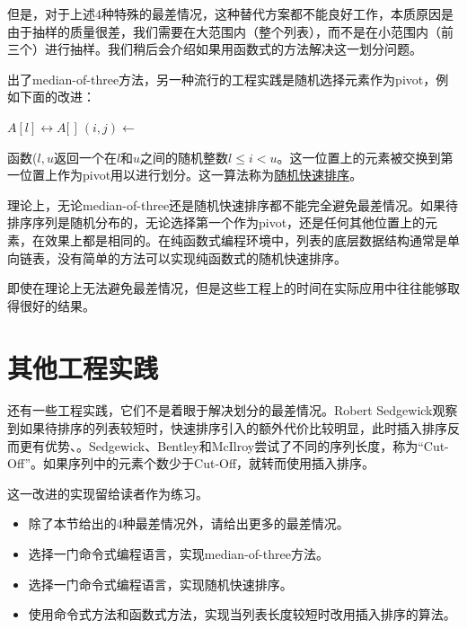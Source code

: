 \documentclass[UTF8]{article}
\begin{document}
但是，对于上述4种特殊的最差情况，这种替代方案都不能良好工作，本质原因是由于抽样的质量很差，我们需要在大范围内（整个列表），而不是在小范围内（前三个）进行抽样。我们稍后会介绍如果用函数式的方法解决这一划分问题。

出了median-of-three方法，另一种流行的工程实践是随机选择元素作为pivot，例如下面的改进：

\begin{algorithmic}[1]
    \State {} $A[l] \leftrightarrow A[$  $]$
    \State $(i, j) \gets $ 
    \State {}
    \State {}
  \EndIf
\EndProcedure
\end{algorithmic}

函数($l, u$返回一个在$l$和$u$之间的随机整数$l \leq i < u$。这一位置上的元素被交换到第一位置上作为pivot用以进行划分。这一算法称为\underline{随机快速排序}\cite{CLRS}。

理论上，无论median-of-three还是随机快速排序都不能完全避免最差情况。如果待排序序列是随机分布的，无论选择第一个作为pivot，还是任何其他位置上的元素，在效果上都是相同的。在纯函数式编程环境中，列表的底层数据结构通常是单向链表，没有简单的方法可以实现纯函数式的随机快速排序。

即使在理论上无法避免最差情况，但是这些工程上的时间在实际应用中往往能够取得很好的结果。

\section{其他工程实践}

还有一些工程实践，它们不是着眼于解决划分的最差情况。Robert Sedgewick观察到如果待排序的列表较短时，快速排序引入的额外代价比较明显，此时插入排序反而更有优势\cite{pearls}、\cite{3-way-part}。Sedgewick、Bentley和McIlroy尝试了不同的序列长度，称为“Cut-Off”。如果序列中的元素个数少于Cut-Off，就转而使用插入排序。

\begin{algorithmic}[1]
    \State {}
  \Else
    \State {}
  \EndIf
\EndProcedure
\end{algorithmic}

这一改进的实现留给读者作为练习。

\begin{Exercise}
\begin{itemize}
\item 除了本节给出的4种最差情况外，请给出更多的最差情况。
\item 选择一门命令式编程语言，实现median-of-three方法。
\item 选择一门命令式编程语言，实现随机快速排序。
\item 使用命令式方法和函数式方法，实现当列表长度较短时改用插入排序的算法。
\end{itemize}
\end{Exercise}
\end{document}
